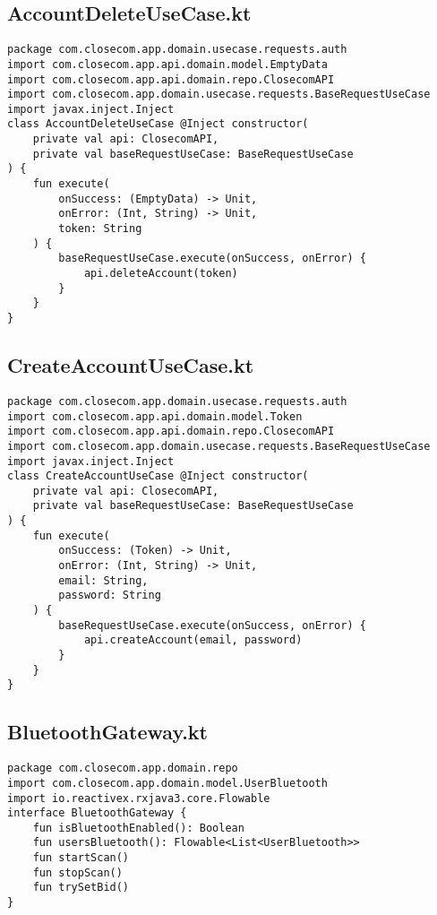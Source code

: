 \documentclass[listing]{espd}
\begin{document}
\subsection{AccountDeleteUseCase.kt}
\begin{verbatim}
package com.closecom.app.domain.usecase.requests.auth
import com.closecom.app.api.domain.model.EmptyData
import com.closecom.app.api.domain.repo.ClosecomAPI
import com.closecom.app.domain.usecase.requests.BaseRequestUseCase
import javax.inject.Inject
class AccountDeleteUseCase @Inject constructor(
    private val api: ClosecomAPI,
    private val baseRequestUseCase: BaseRequestUseCase
) {
    fun execute(
        onSuccess: (EmptyData) -> Unit,
        onError: (Int, String) -> Unit,
        token: String
    ) {
        baseRequestUseCase.execute(onSuccess, onError) {
            api.deleteAccount(token)
        }
    }
}
\end{verbatim}

\subsection{CreateAccountUseCase.kt}
\begin{verbatim}
package com.closecom.app.domain.usecase.requests.auth
import com.closecom.app.api.domain.model.Token
import com.closecom.app.api.domain.repo.ClosecomAPI
import com.closecom.app.domain.usecase.requests.BaseRequestUseCase
import javax.inject.Inject
class CreateAccountUseCase @Inject constructor(
    private val api: ClosecomAPI,
    private val baseRequestUseCase: BaseRequestUseCase
) {
    fun execute(
        onSuccess: (Token) -> Unit,
        onError: (Int, String) -> Unit,
        email: String,
        password: String
    ) {
        baseRequestUseCase.execute(onSuccess, onError) {
            api.createAccount(email, password)
        }
    }
}
\end{verbatim}

\subsection{BluetoothGateway.kt}
\begin{verbatim}
package com.closecom.app.domain.repo
import com.closecom.app.domain.model.UserBluetooth
import io.reactivex.rxjava3.core.Flowable
interface BluetoothGateway {
    fun isBluetoothEnabled(): Boolean
    fun usersBluetooth(): Flowable<List<UserBluetooth>>
    fun startScan()
    fun stopScan()
    fun trySetBid()
}
\end{verbatim}
\end{document}
